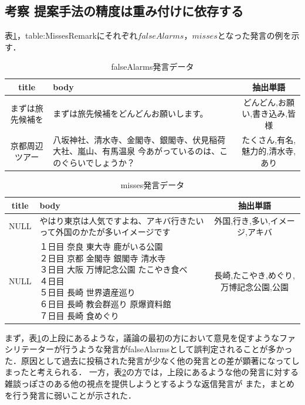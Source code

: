 \subsection*{考察 提案手法の精度は重み付けに依存する}
表\ref{table:FalseAlarmsRemark}，{table:MissesRemark}にそれぞれ$falseAlarms$，$misses$となった発言の例を示す．
\begin{table}[htbp]
  \begin{tabular}{| c |  p{6cm} | c |} \hline
     title & body  & 抽出単語 \\ \hline
     まずは旅先候補を&まずは旅先候補をどんどんお願いします。&どんどん,お願い,書き込み,皆様\\ \hline
     京都周辺ツアー &八坂神社、清水寺、金閣寺、銀閣寺、伏見稲荷大社、嵐山、有馬温泉 今あがっているのは、このぐらいでしょうか？&たくさん,有名,魅力的,清水寺,あり\\
     \hline
  \end{tabular}
  \caption{falseAlarms発言データ} \label{table:FalseAlarmsRemark}
\end{table}
\begin{table}[htbp]
\begin{center}
  \begin{tabular}{| c | p{8cm} | c |} \hline
     title & body & 抽出単語 \\ \hline
     NULL&やはり東京は人気ですよね、アキバ行きたいって外国のかたが多いイメージです & 外国,行き,多い,イメージ,アキバ \\ \hline
     NULL &  \shortstack{１日目 奈良 東大寺 鹿がいる公園\\
 ２日目 京都 金閣寺 銀閣寺 清水寺\\
 ３日目 大阪 万博記念公園 たこやき食べ\\
 ４日目\\
 ５日目 長崎 世界遺産巡り\\
 ６日目 長崎 教会群巡り 原爆資料館\\
 ７日目 長崎 食めぐり} & 長崎,たこやき,めぐり,万博記念公園,公園\\
     \hline
  \end{tabular}
  \caption{misses発言データ} \label{table:MissesRemark}
  \end{center}
\end{table}
まず，表\ref{table:FalseAlarmsRemark}の上段にあるような，議論の最初の方において意見を促すようなファシリテーターが行うような発言がfalseAlarmsとして誤判定されることが多かった．原因として過去に投稿された発言が少なく他の発言との差が顕著になってしまったと考えられる．
一方，表\ref{table:MissesRemark}の方では，上段にあるような他の発言に対する雑談っぽさのある他の視点を提供しようとするような返信発言が
また，まとめを行う発言に弱いことが示された．

